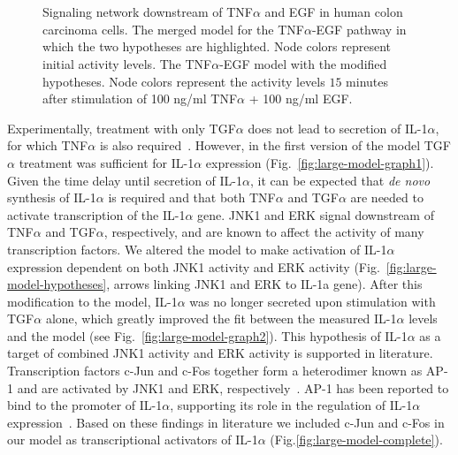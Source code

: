 \begin{figure}[!htpb]
\\
 \\ 
\caption{ Signaling network downstream of TNF$\alpha$ and EGF in human colon carcinoma cells.
{\bf \protect{}} The merged model for the TNF$\alpha$-EGF pathway in which the two hypotheses are highlighted. Node colors represent initial activity levels.
{\bf \protect{}} The TNF$\alpha$-EGF model with the modified hypotheses. Node colors represent the activity levels $15$ minutes
after stimulation of 100 ng/ml TNF$\alpha$ + 100 ng/ml EGF.}\label{fig:large-model-all}
\end{figure}


Experimentally,
treatment with only TGF$\alpha$ does not lead to secretion of IL-1$\alpha$, for which
 TNF$\alpha$ is also required~\citep{pathway-autocrine}.
However, in the first version of the model TGF$\alpha$ treatment was sufficient for
 IL-1$\alpha$ expression (Fig.~\ref{fig:large-model-graph1}). Given the time delay until secretion of IL-1$\alpha$, it can be
 expected that \emph{de novo} synthesis of IL-1$\alpha$ is required and that both
 TNF$\alpha$ and TGF$\alpha$ are needed to activate transcription of the IL-1$\alpha$ gene.
 JNK1 and ERK signal downstream of TNF$\alpha$ and TGF$\alpha$, respectively, and are known
to affect the activity of many transcription factors. We altered the model to make
 activation of IL-1$\alpha$ expression dependent on both JNK1 activity and ERK activity
(Fig.~\ref{fig:large-model-hypotheses}, arrows linking {\sf JNK1} and {\sf ERK} to {\sf IL-1a gene}).
 After this modification to the model, IL-1$\alpha$ was no longer secreted
upon stimulation with TGF$\alpha$ alone, which greatly improved the fit between the measured IL-1$\alpha$ levels and the model (see
 Fig.~\ref{fig:large-model-graph2}). This hypothesis of IL-1$\alpha$ as a target of combined JNK1 activity and
 ERK activity is supported in literature. Transcription factors c-Jun and c-Fos together
 form a heterodimer known as AP-1 and are activated by JNK1 and ERK,
respectively~\citep{jnk-signaling,cfos-cjun}. AP-1 has been reported to bind to the
 promoter of IL-1$\alpha$, supporting its role in the regulation of IL-1$\alpha$
 expression~\citep{ap1-il1a}. Based on these findings in literature we included c-Jun and
c-Fos in our model as transcriptional activators of IL-1$\alpha$ (Fig.\ref{fig:large-model-complete}).


